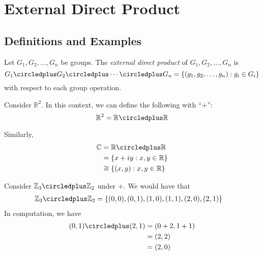 \chapter{External Direct Product}

\section{Definitions and Examples}

\begin{definition}
    Let \(G_1, G_2, \ldots, G_n\) be groups. The \textit{external direct product} of \(G_1, G_2, \ldots, G_n\) is
    \[
        G_1 \circledplus G_2 \circledplus \cdots \circledplus G_n = 
        \left\{(g_1, g_2, \ldots, g_n) : g_i \in G_i\right\}
    \]
    with respect to each group operation.
\end{definition}

\begin{nexample}
    Consider \(\mathbb{R}^2\). In this context, we can define the following with ``\(+\)'':
    \[
        \mathbb{R}^2 = \mathbb{R} \circledplus \mathbb{R}
    \]

    Similarly,
    \[
    \begin{aligned}
        \mathbb{C} &= \mathbb{R} \circledplus \mathbb{R} \\
                   &= \left\{x + iy : x, y \in \mathbb{R}\right\} \\
                   &\cong \left\{(x, y) : x, y \in \mathbb{R}\right\}
    \end{aligned}
    \]
\end{nexample}

\begin{nexample}
    Consider \(\mathbb{Z}_3 \circledplus \mathbb{Z}_2\) under \(+\). We would have that
    \[
    \begin{aligned}
        \mathbb{Z}_3 \circledplus \mathbb{Z}_2 
            &= \left\{(0, 0), (0, 1), (1, 0), (1, 1), (2, 0), (2, 1)\right\}
    \end{aligned}
    \]
    In computation, we have
    \[
    \begin{aligned}
        (0, 1) \circledplus (2, 1) &= (0+2, 1+1) \\
                                   &= (2, 2) \\
                                   &= (2, 0)
    \end{aligned}
    \]
\end{nexample}

